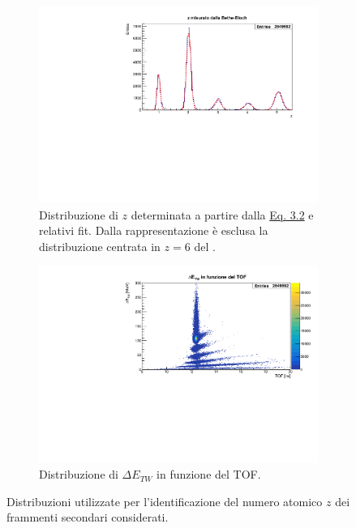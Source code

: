\documentclass[12pt,a4paper,twoside]{report}
\begin{document}
	\begin{figure}[H]
		\centering
		\begin{subfigure}[t]{0.78\textwidth}
			\centering
			\includegraphics[width=\textwidth, scale=0.50]{Bethe3.pdf}
			\caption{Distribuzione di $z$ determinata a partire dalla \hyperref[eq:atomic_number]{Eq. 3.2} e relativi fit. Dalla rappresentazione è esclusa la distribuzione centrata in $z=6$ del .}
			\label{fig:atomic_numbersa}
		\end{subfigure}
		\par
		\begin{subfigure}[t]{0.78\textwidth}
			\centering
			\includegraphics[width=\textwidth, scale=0.50]{c_E_TOF.pdf}
			\caption{Distribuzione di $\Delta E_{TW}$ in funzione del TOF.}
			\label{fig:atomic_numbersb}
		\end{subfigure}
		\caption{Distribuzioni utilizzate per l'identificazione del numero atomico $z$ dei frammenti secondari considerati.}
		\label{fig:atomic_numbers}
	\end{figure}
\end{document}
